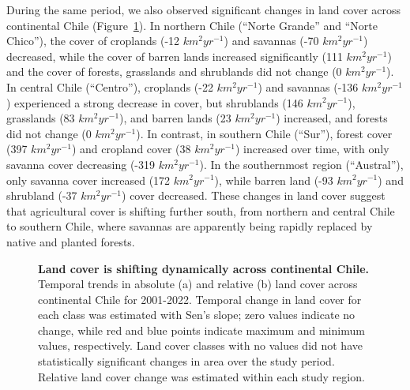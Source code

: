 \documentclass[
  sn-nature,
  numbered]{sn-jnl}
\begin{document}
During the same period, we also observed significant changes in land
cover across continental Chile (Figure~\ref{fig-temp_var_landcover}). In
northern Chile (``Norte Grande'' and ``Norte Chico''), the cover of
croplands (-12 \(km^2 yr^{-1}\)) and savannas (-70 \(km^2 yr^{-1}\))
decreased, while the cover of barren lands increased significantly (111
\(km^2 yr^{-1}\)) and the cover of forests, grasslands and shrublands
did not change (0 \(km^2 yr^{-1}\)). In central Chile (``Centro''),
croplands (-22 \(km^2 yr^{-1}\)) and savannas (-136 \(km^2 yr^{-1}\))
experienced a strong decrease in cover, but shrublands (146
\(km^2 yr^{-1}\)), grasslands (83 \(km^2 yr^{-1}\)), and barren lands
(23 \(km^2 yr^{-1}\)) increased, and forests did not change (0
\(km^2 yr^{-1}\)). In contrast, in southern Chile (``Sur''), forest
cover (397 \(km^2 yr^{-1}\)) and cropland cover (38 \(km^2 yr^{-1}\))
increased over time, with only savanna cover decreasing (-319
\(km^2 yr^{-1}\)). In the southernmost region (``Austral''), only
savanna cover increased (172 \(km^2 yr^{-1}\)), while barren land (-93
\(km^2 yr^{-1}\)) and shrubland (-37 \(km^2 yr^{-1}\)) cover decreased.
These changes in land cover suggest that agricultural cover is shifting
further south, from northern and central Chile to southern Chile, where
savannas are apparently being rapidly replaced by native and planted
forests.

\begin{figure}[!ht]


\caption{\label{fig-temp_var_landcover}\textbf{Land cover is shifting
dynamically across continental Chile.} Temporal trends in absolute (a)
and relative (b) land cover across continental Chile for 2001-2022.
Temporal change in land cover for each class was estimated with Sen's
slope; zero values indicate no change, while red and blue points
indicate maximum and minimum values, respectively. Land cover classes
with no values did not have statistically significant changes in area
over the study period. Relative land cover change was estimated within
each study region.}

\end{figure}%
\end{document}
